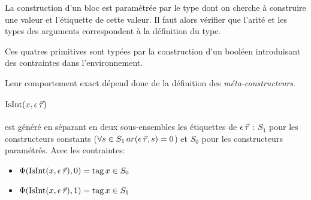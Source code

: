 \begin{mathpar}
\end{mathpar}
%
La construction d'un bloc est paramétrée par le type dont on cherche à
construire une valeur et l'étiquette de cette valeur. Il faut alors vérifier que
l'arité et les types des arguments correspondent à la définition du type.

\begin{mathpar}



\end{mathpar}
%
Ces quatres primitives sont typées par la construction d'un booléen
introduisant des contraintes dans l'environnement.

Leur comportement exact dépend donc de la définition des \emph{méta-constructeurs}.

\paragraph{$\kw{IsInt}(x,{\dtype})$} est généré en séparant en deux
sous-ensembles les étiquettes de $\dtype$ : $S_1$ pour les constructeurs
constants ($\forall s \in S_1 \, ar(\dtype,s) = 0$) et $S_0$ pour les
constructeurs paramétrés.  Avec les contraintes: 
\begin{itemize}
  \item $\Phi(\kw{IsInt}(x,{\dtype}),0) = \kw{tag} \var \in S_0$
  \item $\Phi(\kw{IsInt}(x,{\dtype}),1) = \kw{tag} \var \in S_1$
\end{itemize}

